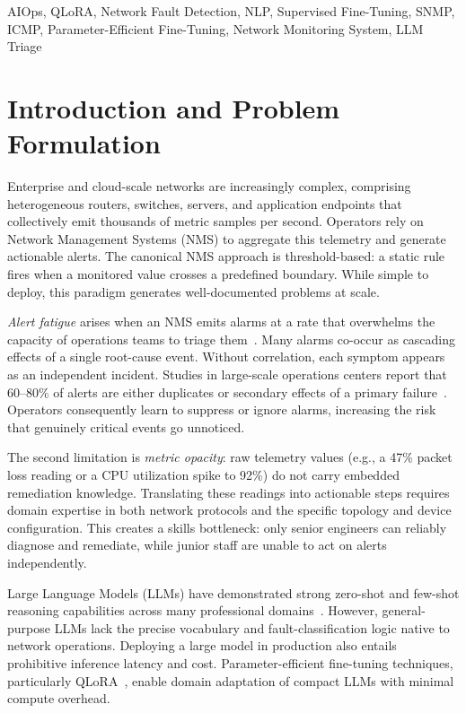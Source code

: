 \documentclass[conference]{IEEEtran}
\begin{document}
\begin{IEEEkeywords}
AIOps, QLoRA, Network Fault Detection, NLP, Supervised Fine-Tuning, SNMP, ICMP, Parameter-Efficient Fine-Tuning, Network Monitoring System, LLM Triage
\end{IEEEkeywords}

\section{Introduction and Problem Formulation}
\label{sec:intro}

Enterprise and cloud-scale networks are increasingly complex, comprising heterogeneous routers, switches, servers, and application endpoints that collectively emit thousands of metric samples per second. Operators rely on Network Management Systems (NMS) to aggregate this telemetry and generate actionable alerts. The canonical NMS approach is threshold-based: a static rule fires when a monitored value crosses a predefined boundary. While simple to deploy, this paradigm generates well-documented problems at scale.

\textit{Alert fatigue} arises when an NMS emits alarms at a rate that overwhelms the capacity of operations teams to triage them~\cite{chen2019outage}. Many alarms co-occur as cascading effects of a single root-cause event. Without correlation, each symptom appears as an independent incident. Studies in large-scale operations centers report that 60--80\% of alerts are either duplicates or secondary effects of a primary failure~\cite{luo2021ntam}. Operators consequently learn to suppress or ignore alarms, increasing the risk that genuinely critical events go unnoticed.

The second limitation is \textit{metric opacity}: raw telemetry values (e.g., a 47\% packet loss reading or a CPU utilization spike to 92\%) do not carry embedded remediation knowledge. Translating these readings into actionable steps requires domain expertise in both network protocols and the specific topology and device configuration. This creates a skills bottleneck: only senior engineers can reliably diagnose and remediate, while junior staff are unable to act on alerts independently.

Large Language Models (LLMs) have demonstrated strong zero-shot and few-shot reasoning capabilities across many professional domains~\cite{brown2020gpt3, touvron2023llama2}. However, general-purpose LLMs lack the precise vocabulary and fault-classification logic native to network operations. Deploying a large model in production also entails prohibitive inference latency and cost. Parameter-efficient fine-tuning techniques, particularly QLoRA~\cite{dettmers2023qlora}, enable domain adaptation of compact LLMs with minimal compute overhead.
\end{document}
